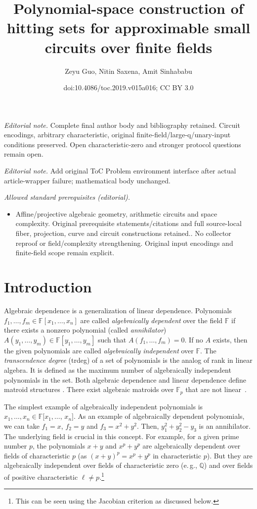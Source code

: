 \documentclass[11pt]{article}
\title{Polynomial-space construction of hitting sets for approximable small circuits over finite fields}
\author{Zeyu Guo, Nitin Saxena, Amit Sinhababu}
\date{doi:10.4086/toc.2019.v015a016; CC BY 3.0}
\numberwithin{equation}{section}
\theoremstyle{definition}
\theoremstyle{plain}
\newcommand{\eg}{e.\,g.}
\newcommand{\F}{\mathbb{F}}
\begin{document}
\maketitle
\noindent\textit{Editorial note.} Complete final author body and bibliography retained. Circuit encodings, arbitrary characteristic, original finite-field/large-q/unary-input conditions preserved. Open characteristic-zero and stronger protocol questions remain open.\par\medskip
\noindent\textit{Editorial note.} Add original ToC Problem environment interface after actual article-wrapper failure; mathematical body unchanged.\par\medskip
\noindent\textit{Allowed standard prerequisites (editorial).}\begin{itemize}
\item Affine/projective algebraic geometry, arithmetic circuits and space complexity. Original prerequisite statements/citations and full source-local fiber, projection, curve and circuit constructions retained.. No collector reproof or field/complexity strengthening. Original input encodings and finite-field scope remain explicit.
\end{itemize}\medskip
\section{Introduction}
%

Algebraic dependence is a generalization of linear dependence. Polynomials $f_1,\ldots ,f_m \in \F[x_1, \ldots ,x_n]$ are called \emph{algebraically dependent} over
the  %
field $\F$ if there exists a nonzero polynomial (called \emph{annihilator}) $A(y_1,\ldots ,y_m)\in \F[y_1,\ldots ,y_m]$ such that $A(f_1,\ldots,f_m)=0$. If no $A$ exists, then the given polynomials are called \emph{algebraically independent} over $\F$. The \emph{transcendence degree} (trdeg) of a set of polynomials is the analog of rank in linear algebra. It is defined as the
%
maximum   %
number of algebraically independent polynomials in the set. Both algebraic dependence and linear dependence
%
%
define matroid structures  %
\cite{ehrenborg1993apolarity}.
%
There exist algebraic matroids over $\F_p$ that are not
linear~\cite{ingleton1971representation}.   %

The simplest
%
example
of algebraically independent polynomials
%
is
$x_1,\ldots,x_n \in \F[x_1, \ldots$, $x_n] $. As an example of algebraically dependent polynomials, we can take $f_1=x$, $f_2=y$ and $f_3=x^2+y^2$. Then, $y_1^2 + y_2^2-y_3$ is an annihilator. The underlying field is crucial in this concept.
%
For example, for a given prime number $p$, the polynomials $x+y$ and $x^p + y^p$ are algebraically dependent over fields of characteristic $p$ (as $(x+y)^p=x^p+y^p$ in characteristic $p$).
But they are algebraically independent over fields of characteristic zero (\eg, $\mathbb{Q}$) %
and over fields of positive characteristic $\ell\neq p$.\footnote{This can be seen using the Jacobian criterion \cite{Jac41, BMS13} as discussed below.} %
\end{document}

